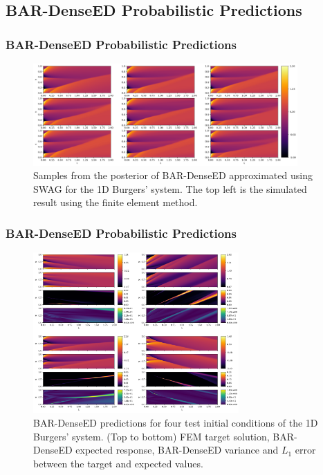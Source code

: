 \documentclass{beamer}
\theoremstyle{remark}
\begin{document}
\subsection{BAR-DenseED Probabilistic Predictions}

\begin{frame}
\frametitle{BAR-DenseED Probabilistic Predictions}
%
\begin{figure}[H]
    \centering
    \includegraphics[width=0.9\textwidth]{Fig12.png}
    \caption{Samples from the posterior of BAR-DenseED approximated using SWAG for the 1D Burgers' system. The top left is the simulated result using the finite element method.} 
    \label{fig:burgers1D-bar-samples}
\end{figure}
\end{frame}

\begin{frame}
\frametitle{BAR-DenseED Probabilistic Predictions}
\begin{figure}[H]
    \centering
    \includegraphics[width=0.7\textwidth]{Fig13.png}
    \caption{BAR-DenseED predictions for four test initial conditions of the 1D Burgers' system. (Top to bottom) FEM target solution, BAR-DenseED expected response, BAR-DenseED variance and $L_1$ error between the target and expected values.}
    \label{fig:burgers1D-BARDenseED}
\end{figure}
\end{frame}
\end{document}
